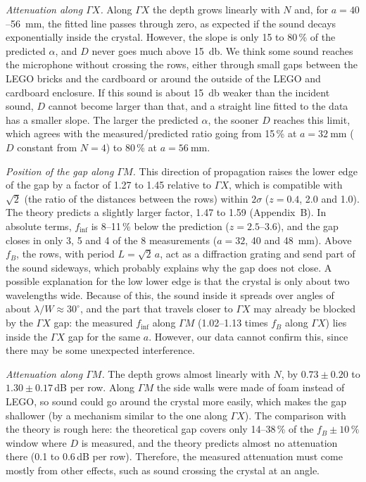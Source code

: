 \documentclass[9pt,a4paper,twocolumn]{extarticle}
\newcommand{\umm}{\milli\metre}
\newcommand{\udB}{\decibel}
\newcommand{\GX}{\ensuremath{\Gamma X}}
\newcommand{\GM}{\ensuremath{\Gamma M}}
\newcommand{\finf}{\ensuremath{f_{\mathrm{inf}}}}
\begin{document}
\emph{Attenuation along \GX.} Along \GX{} the depth grows linearly with $N$ and, for $a=40$--\SI{56}{\umm}, the fitted line passes through zero, as expected if the sound decays exponentially inside the crystal. However, the slope is only 15 to 80\,\% of the predicted $\alpha$, and $D$ never goes much above \SI{15}{\udB}. We think some sound reaches the microphone without crossing the rows, either through small gaps between the LEGO bricks and the cardboard or around the outside of the LEGO and cardboard enclosure. If this sound is about \SI{15}{\udB} weaker than the incident sound, $D$ cannot become larger than that, and a straight line fitted to the data has a smaller slope. The larger the predicted $\alpha$, the sooner $D$ reaches this limit, which agrees with the measured/predicted ratio going from 15\,\% at $a=\SI{32}{\umm}$ ($D$ constant from $N=4$) to 80\,\% at $a=\SI{56}{\umm}$.

\emph{Position of the gap along \GM.} This direction of propagation raises the lower edge of the gap by a factor of 1.27 to 1.45 relative to \GX, which is compatible with $\sqrt2$ (the ratio of the distances between the rows) within $2\sigma$ ($z=0.4$, 2.0 and 1.0). The theory predicts a slightly larger factor, 1.47 to 1.59 (Appendix~B). In absolute terms, \finf{} is 8--11\,\% below the prediction ($z=2.5$--3.6), and the gap closes in only 3, 5 and 4 of the 8 measurements ($a=32$, 40 and \SI{48}{\umm}). Above $f_B$, the rows, with period $L=\sqrt2\,a$, act as a diffraction grating and send part of the sound sideways, which probably explains why the gap does not close. A possible explanation for the low lower edge is that the crystal is only about two wavelengths wide. Because of this, the sound inside it spreads over angles of about $\lambda/W\approx30^\circ$, and the part that travels closer to \GX{} may already be blocked by the \GX{} gap: the measured \finf{} along \GM{} (1.02--1.13 times $f_B$ along \GX) lies inside the \GX{} gap for the same $a$. However, our data cannot confirm this, since there may be some unexpected interference.

\emph{Attenuation along \GM.} The depth grows almost linearly with $N$, by $0.73\pm0.20$ to $1.30\pm0.17$\,dB per row. Along \GM{} the side walls were made of foam instead of LEGO, so sound could go around the crystal more easily, which makes the gap shallower (by a mechanism similar to the one along \GX). The comparison with the theory is rough here: the theoretical gap covers only 14--38\,\% of the $f_B\pm10\,\%$ window where $D$ is measured, and the theory predicts almost no attenuation there (0.1 to 0.6\,dB per row). Therefore, the measured attenuation must come mostly from other effects, such as sound crossing the crystal at an angle.
\end{document}
